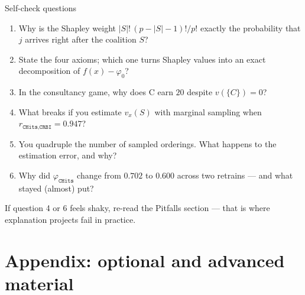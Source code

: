\documentclass[aspectratio=169,11pt]{beamer}
\begin{document}
\begin{frame}{Self-check questions}
  \begin{readme}
    \begin{enumerate}
      \item Why is the Shapley weight $|S|!\,(p-|S|-1)!/p!$ exactly the probability
            that $j$ arrives right after the coalition $S$?
      \item State the four axioms; which one turns Shapley values into an exact
            decomposition of $f(x)-\varphi_0$?
      \item In the consultancy game, why does C earn $20$ despite
            $v(\{C\})=0$?
      \item What breaks if you estimate $v_x(S)$ with marginal sampling when
            $r_{\texttt{CHits},\texttt{CRBI}}=0.947$?
      \item You quadruple the number of sampled orderings. What happens to the
            estimation error, and why?
      \item Why did $\varphi_{\texttt{CHits}}$ change from $0.702$ to $0.600$
            across two retrains --- and what stayed (almost) put?
    \end{enumerate}
  \end{readme}
  \begin{takeaway}
    If question 4 or 6 feels shaky, re-read the Pitfalls section --- that is where
    explanation projects fail in practice.
  \end{takeaway}
\end{frame}

\appendix
\AtBeginSection[]{}
\section{Appendix: optional and advanced material}
\end{document}
